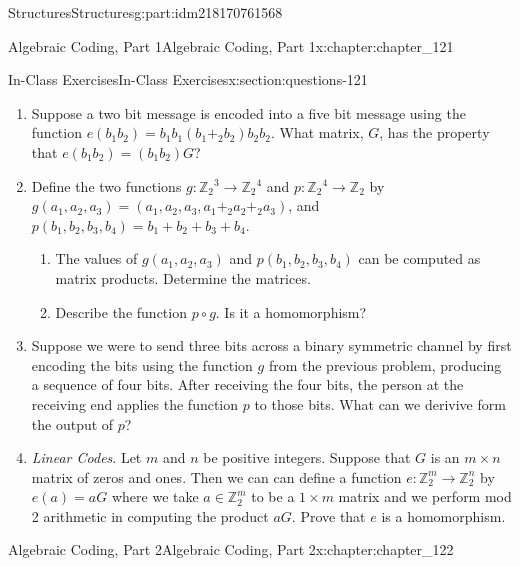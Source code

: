 \documentclass[oneside,10pt,]{book}
\numberwithin{equation}{section}
\begin{document}
\begin{partptx}{Structures}{}{Structures}{}{}{g:part:idm218170761568}
\begin{chapterptx}{Algebraic Coding, Part 1}{}{Algebraic Coding, Part 1}{}{}{x:chapter:chapter_121}
\typeout{************************************************}
%
\begin{sectionptx}{In-Class Exercises}{}{In-Class Exercises}{}{}{x:section:questions-121}
%
\begin{enumerate}[label=\arabic*.]
\item{}Suppose a two bit message is encoded into a five bit message using the function \(e(b_{1}b_{2})=b_{1}b_{1}(b_{1}+_2 b_{2})b_{2}b_{2}\).  What matrix, \(G\), has the property that \(e(b_{1}b_{2})=(b_{1} b_{2}) G\)?%
\item{}Define the two functions  \(g:\mathbb{Z}_2{}^3\rightarrow  \mathbb{Z}_2{}^4\)  and \(p:\mathbb{Z}_2{}^4\to \mathbb{Z}_2\) by \(g(a_1,a_2,a_3) = (a_1,a_2,a_3 ,a_1+_2 a_2+_2a_3)\), and \(p(b_1,b_2,b_3,b_4)=b_1+b_2+b_3+b_4\).%
\begin{enumerate}[label=(\alph*)]
\item{}The values of \(g(a_1,a_2,a_3)\) and \(p(b_1,b_2,b_3,b_4)\) can be computed as matrix products.  Determine the matrices.%
\item{}Describe the function \(p \circ g\). Is it a homomorphism?%
\end{enumerate}
%
\item{}Suppose we were to send three bits across a binary symmetric channel by first encoding the bits using the function \(g\) from the previous problem, producing a sequence of four bits.   After receiving the four bits, the person at the receiving end applies the function \(p\) to those bits.   What can we derivive form the output of \(p\)?%
\item{}\emph{Linear Codes}.  Let \(m\) and \(n\) be positive integers.  Suppose that \(G\) is an \(m \times n\) matrix of zeros and ones.  Then we can can define a function \(e:\mathbb{Z}_2^m \rightarrow \mathbb{Z}_2^n\) by \(e(a)=a G\) where we take \(a \in \mathbb{Z}_2^m\) to be a 	\(1\times m\) matrix and we perform mod 2 arithmetic in computing the product \(a G\).  Prove that \(e\) is a homomorphism.%
\end{enumerate}
%
\end{sectionptx}
\end{chapterptx}
%
\typeout{************************************************}
\typeout{************************************************}
%
\begin{chapterptx}{Algebraic Coding, Part 2}{}{Algebraic Coding, Part 2}{}{}{x:chapter:chapter_122}
\index{}%
%
%
\typeout{************************************************}

\end{chapterptx}
\end{partptx}
\end{document}
